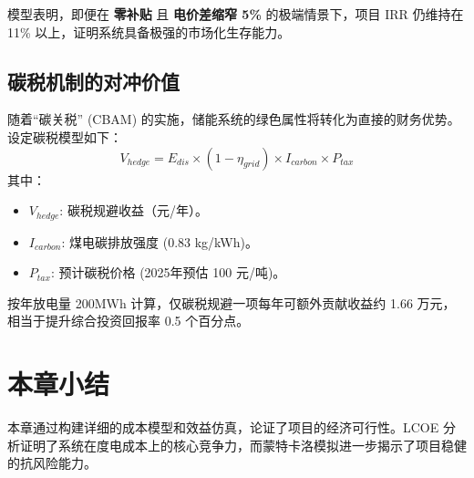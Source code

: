 模型表明，即便在 \textbf{零补贴} 且 \textbf{电价差缩窄 5\%} 的极端情景下，项目 IRR 仍维持在 11\% 以上，证明系统具备极强的市场化生存能力。

\subsection{碳税机制的对冲价值}

随着“碳关税” (CBAM) 的实施，储能系统的绿色属性将转化为直接的财务优势。设定碳税模型如下：
\begin{equation}
    V_{hedge} = E_{dis} \times (1 - \eta_{grid}) \times I_{carbon} \times P_{tax}
\end{equation}
其中：
\begin{itemize}
    \item $V_{hedge}$: 碳税规避收益（元/年）。
    \item $I_{carbon}$: 煤电碳排放强度 (0.83 kg/kWh)。
    \item $P_{tax}$: 预计碳税价格 (2025年预估 100 元/吨)。
\end{itemize}

按年放电量 200MWh 计算，仅碳税规避一项每年可额外贡献收益约 1.66 万元，相当于提升综合投资回报率 0.5 个百分点。

\section{本章小结}
本章通过构建详细的成本模型和效益仿真，论证了项目的经济可行性。LCOE 分析证明了系统在度电成本上的核心竞争力，而蒙特卡洛模拟进一步揭示了项目稳健的抗风险能力。

